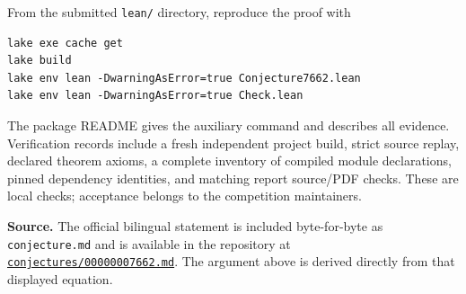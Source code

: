 \documentclass[11pt]{article}
\begin{document}
From the submitted \texttt{lean/} directory, reproduce the proof with
\begin{verbatim}
lake exe cache get
lake build
lake env lean -DwarningAsError=true Conjecture7662.lean
lake env lean -DwarningAsError=true Check.lean
\end{verbatim}
The package README gives the auxiliary command and describes all evidence.
Verification records include a fresh independent project build, strict
source replay, declared theorem axioms, a complete inventory of compiled
module declarations, pinned dependency identities, and matching report
source/PDF checks. These are local checks; acceptance belongs to the
competition maintainers.

\textbf{Source.} The official bilingual statement is included byte-for-byte
as \texttt{conjecture.md} and is available in the repository at
\href{https://github.com/The-Last-Math-Competition/The-Last-Math-Competition/blob/main/conjectures/00000007662.md}{\texttt{conjectures/00000007662.md}}.
The argument above is derived directly from that displayed equation.
\end{document}
